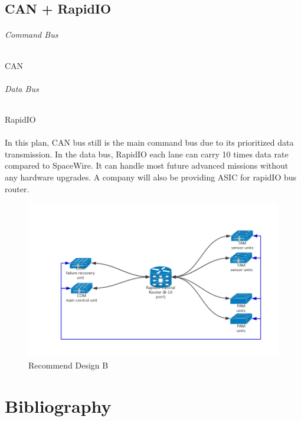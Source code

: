 \documentclass[12pt,article]{memoir}
\begin{document}
\section{CAN + RapidIO}
\subparagraph{Command Bus}CAN
\subparagraph{Data Bus}RapidIO\\\\
In this plan, CAN bus still is the main command bus due to its prioritized data transmission. In the data bus, RapidIO each lane can carry 10 times data rate compared to SpaceWire. It can handle most future advanced missions without any hardware upgrades. A company will also be providing ASIC for rapidIO bus router.
\begin{figure}[htp]
\includegraphics[width=\textwidth]{img/DR00001_RapidIO.png}
 \caption{Recommend Design B}	
\end{figure}
\newpage
\chapter{Bibliography}

\printbibliography[heading=none]
\end{document}
